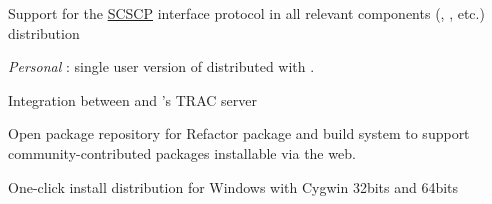 \begin{workpackage}[id=component-architecture,wphases=0-48!.5,
  title=Component Architecture,lead=UV,
  PSRM=50,UVRM=8,SARM=16, USORM=6, UORM=4, LLRM=14, UJFRM=6, UGRM=14]
\begin{wpdelivs}
    \begin{wpdeliv}[due=12,miles=startup,id=scscp-sage,dissem=PU,nature=OTHER,lead=SA]
      {Support for the \href{http://www.symbolic-computing.org/}{SCSCP} interface protocol
        in all relevant components (\Sage, \GAP, etc.) distribution}
    \end{wpdeliv}

    \begin{wpdeliv}[due=24,miles=proto1,id=personal-smc,dissem=PU,nature=OTHER,lead=PS]
      {\emph{Personal} \SMC: single user version of \SMC distributed
        with \Sage.}
    \end{wpdeliv}%

    \begin{wpdeliv}[due=24,miles=proto1,id=smc-trac,dissem=PU,nature=OTHER,lead=UV]
      {Integration between \SMC and \Sage's TRAC server}
    \end{wpdeliv}
    \begin{wpdeliv}[due=24,miles=proto1,id=sage-repository,dissem=PU,nature=OTHER,lead=UV]
      {Open package repository for \Sage} Refactor \Sage package and
      build system to support community-contributed packages
      installable via the web.
    \end{wpdeliv}

    \begin{wpdeliv}[due=24,miles=proto1,id=portability-cygwin,dissem=PU,nature=OTHER,lead=PS]
      {One-click install \Sage distribution for Windows with Cygwin 32bits and 64bits}


\end{wpdeliv}
\end{wpdelivs}
\end{workpackage}
